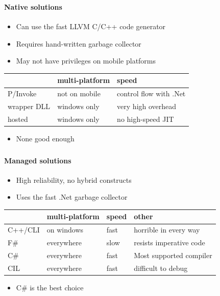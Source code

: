 \begin{frame}
    \frametitle{\subsecname}
    \framesubtitle{Native solutions}

    \begin{itemize}
        \item Can use the fast LLVM C/C++ code generator
        \item Requires hand-written garbage collector
        \item May not have privileges on mobile platforms
    \end{itemize}

    \begin{tabular}{l|l|l}
        & multi-platform & speed \\
        \hline
        P/Invoke      & not on mobile & control flow with .Net\\
        wrapper DLL   & windows only  & very high overhead \\
        hosted        & windows only  & no high-speed JIT \\
    \end{tabular}

    \begin{itemize}
        \item None good enough
    \end{itemize}
\end{frame}

\begin{frame}
    \frametitle{\subsecname}
    \framesubtitle{Managed solutions}

    \begin{itemize}
        \item High reliability, no hybrid constructs
        \item Uses the fast .Net garbage collector
    \end{itemize}

    \begin{tabular}{l|l|l|l}
        & multi-platform & speed & other\\
        \hline
        C++/CLI & on windows & fast & horrible in every way\\
        F\#     & everywhere & slow & resists imperative code\\
        C\#     & everywhere & fast & Most supported compiler\\
        CIL     & everywhere & fast & difficult to debug\\
    \end{tabular}

    \begin{itemize}
        \item C\# is the best choice
    \end{itemize}
\end{frame}

